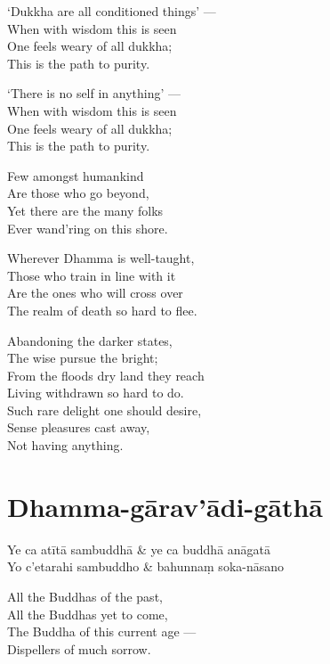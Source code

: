 `Dukkha are all conditioned things' ---\\
When with wisdom this is seen\\
One feels weary of all dukkha;\\
This is the path to purity.

`There is no self in anything' ---\\
When with wisdom this is seen\\
One feels weary of all dukkha;\\
This is the path to purity.

Few amongst humankind\\
Are those who go beyond,\\
Yet there are the many folks\\
Ever wand'ring on this shore.

Wherever Dhamma is well-taught,\\
Those who train in line with it\\
Are the ones who will cross over\\
The realm of death so hard to flee.

Abandoning the darker states,\\
The wise pursue the bright;\\
From the floods dry land they reach\\
Living withdrawn so hard to do.\\
Such rare delight one should desire,\\
Sense pleasures cast away,\\
Not having anything.

\section{Dhamma-gārav'ādi-gāthā}



\begin{twochants}
  Ye ca atītā sambuddhā & ye ca buddhā anāgatā \\
  Yo c'etarahi sambuddho & bahunnaṃ soka-nāsano \\
\end{twochants}

\begin{english}
  All the Buddhas of the past,\\
  All the Buddhas yet to come,\\
  The Buddha of this current age ---\\
  Dispellers of much sorrow.
\end{english}

